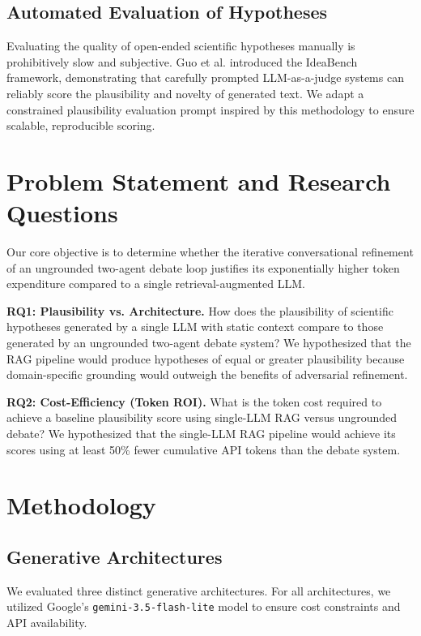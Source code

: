 \documentclass[11pt, conference, onecolumn]{IEEEtran}
\begin{document}
\subsection{Automated Evaluation of Hypotheses}
Evaluating the quality of open-ended scientific hypotheses manually is prohibitively slow and subjective. Guo et al. \cite{guo2025ideabench} introduced the IdeaBench framework, demonstrating that carefully prompted LLM-as-a-judge systems can reliably score the plausibility and novelty of generated text. We adapt a constrained plausibility evaluation prompt inspired by this methodology to ensure scalable, reproducible scoring.

\section{Problem Statement and Research Questions}

Our core objective is to determine whether the iterative conversational refinement of an ungrounded two-agent debate loop justifies its exponentially higher token expenditure compared to a single retrieval-augmented LLM.

\textbf{RQ1: Plausibility vs. Architecture.} How does the plausibility of scientific hypotheses generated by a single LLM with static context compare to those generated by an ungrounded two-agent debate system? We hypothesized that the RAG pipeline would produce hypotheses of equal or greater plausibility because domain-specific grounding would outweigh the benefits of adversarial refinement.

\textbf{RQ2: Cost-Efficiency (Token ROI).} What is the token cost required to achieve a baseline plausibility score using single-LLM RAG versus ungrounded debate? We hypothesized that the single-LLM RAG pipeline would achieve its scores using at least 50\% fewer cumulative API tokens than the debate system.

\section{Methodology}

\subsection{Generative Architectures}
We evaluated three distinct generative architectures. For all architectures, we utilized Google's \texttt{gemini-3.5-flash-lite} model to ensure cost constraints and API availability.
\end{document}
